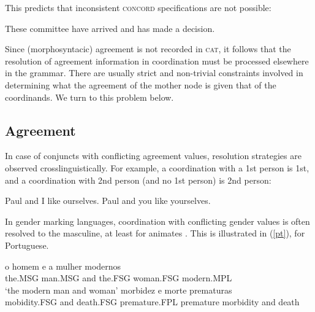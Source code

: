 \documentclass[output=paper
                ,modfonts
                ,nonflat
	        ,collection
	        ,collectionchapter
	        ,collectiontoclongg
 	        ,biblatex
                ,babelshorthands
                ,newtxmath
                ,draftmode
                ,colorlinks, citecolor=brown
]{./langsci/langscibook}
\begin{document}
\noindent
This predicts that inconsistent  \textsc{concord} specifications are not possible:

\begin{exe}
\ex{*} These committee  have arrived and has made a decision.
\end{exe}

\noindent
Since (morphosyntacic) agreement is not recorded in \textsc{cat}, it follows that the resolution of agreement information in coordination must be processed elsewhere in the grammar. There are usually strict and non-trivial constraints involved in determining what the agreement of the mother node is given that of the coordinands. We turn to this problem below.







\subsection{Agreement}


In case of conjuncts with conflicting agreement values, resolution strategies are observed crosslinguistically. For example, a coordination with a 1st person is 1st, and a coordination with 2nd person (and no 1st person) is 2nd person:

\begin{exe}
 \ex
\begin{xlista}
\ex Paul and I like ourselves.
\ex Paul and you like yourselves.
\end{xlista}
\end{exe}

In gender marking languages, coordination with conflicting gender values is often resolved to the masculine, at least for animates \citep{Corbet91}. This is illustrated in (\ref{pt}), for Portuguese.

\begin{exe}
 \ex
\begin{xlista}
\ex o homem e a mulher modernos \\
the.MSG man.MSG and the.FSG woman.FSG modern.MPL \\
`the modern man and woman'
\ex morbidez e morte prematuras \\
mobidity.FSG and death.FSG premature.FPL
premature morbidity and death\\
\citep[433]{Villavicencio:Sadler:ea:05}
\end{xlista}\label{pt}
\end{exe}
\end{document}
